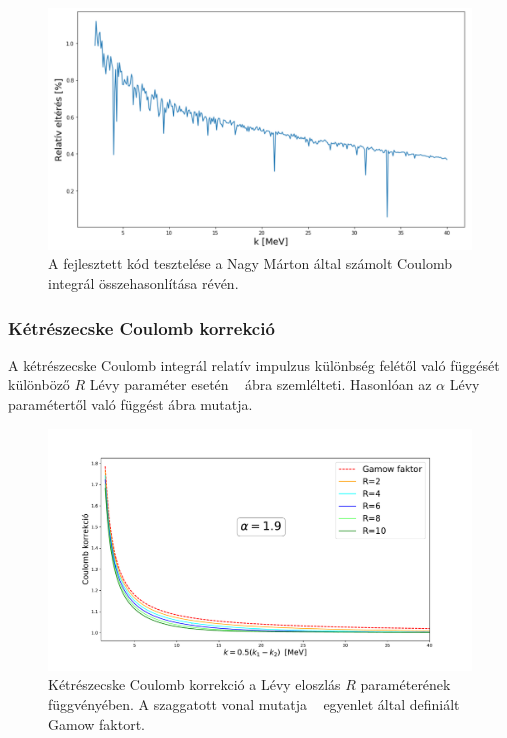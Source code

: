 \documentclass[11pt,a4paper]{article}
\numberwithin{equation}{subsection}
\numberwithin{figure}{section}
\begin{document}
\begin{figure}[H]
\centering
\includegraphics[scale=0.6]{pic/Coulomb/mynm}
\caption{A fejlesztett kód tesztelése a Nagy Márton által számolt Coulomb integrál összehasonlítása révén.}
\label{fig:nmc}
\end{figure}

\subsubsection{Kétrészecske Coulomb korrekció}

A kétrészecske Coulomb integrál relatív impulzus különbség felétől való függését különböző $R$ Lévy paraméter esetén ~ ábra szemlélteti. Hasonlóan az $\alpha$ Lévy paramétertől való függést  ábra mutatja.

\begin{figure}[H]
\centering
\includegraphics[scale=0.45]{pic/Coulomb/C2_dR_a19_S2correct.pdf}
\caption{Kétrészecske Coulomb korrekció a Lévy eloszlás $R$ paraméterének függvényében. A szaggatott vonal mutatja ~ egyenlet által definiált Gamow faktort.}
\label{fig:CRK2dR}
\end{figure}
\end{document}
